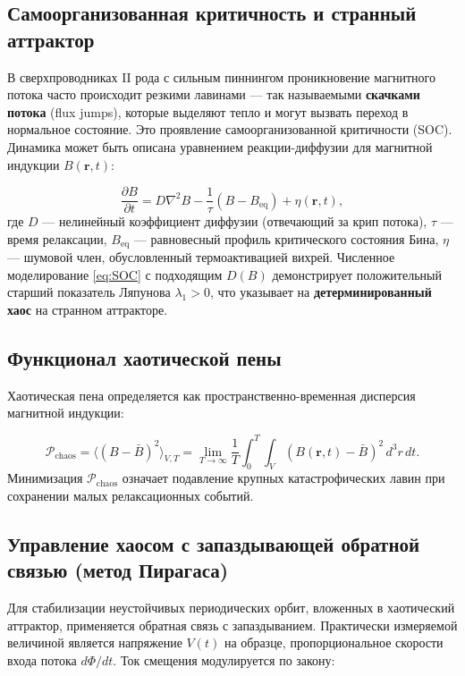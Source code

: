\documentclass[12pt,a4paper]{article}
\numberwithin{equation}{section}
\begin{document}
\subsection{Самоорганизованная критичность и странный аттрактор}

В сверхпроводниках II рода с сильным пиннингом проникновение магнитного потока часто происходит резкими лавинами — так называемыми \textbf{скачками потока} (flux jumps), которые выделяют тепло и могут вызвать переход в нормальное состояние. Это проявление самоорганизованной критичности (SOC). Динамика может быть описана уравнением реакции-диффузии для магнитной индукции $B(\mathbf{r}, t)$:

\begin{equation}
\frac{\partial B}{\partial t} = D \nabla^2 B - \frac{1}{\tau} (B - B_{\text{eq}}) + \eta(\mathbf{r}, t),
\label{eq:SOC}
\end{equation}
где $D$ — нелинейный коэффициент диффузии (отвечающий за крип потока), $\tau$ — время релаксации, $B_{\text{eq}}$ — равновесный профиль критического состояния Бина, $\eta$ — шумовой член, обусловленный термоактивацией вихрей. Численное моделирование \eqref{eq:SOC} с подходящим $D(B)$ демонстрирует положительный старший показатель Ляпунова $\lambda_1 > 0$, что указывает на \textbf{детерминированный хаос} на странном аттракторе.

\subsection{Функционал хаотической пены}

Хаотическая пена определяется как пространственно-временная дисперсия магнитной индукции:

\begin{equation}
\mathcal{P}_{\text{chaos}} = \langle (B - \bar{B})^2 \rangle_{V,T} = \lim_{T\to\infty} \frac{1}{T} \int_0^T \int_V (B(\mathbf{r},t) - \bar{B})^2 \, d^3 r \, dt.
\label{eq:Pchaos}
\end{equation}
Минимизация $\mathcal{P}_{\text{chaos}}$ означает подавление крупных катастрофических лавин при сохранении малых релаксационных событий.

\subsection{Управление хаосом с запаздывающей обратной связью (метод Пирагаса)}

Для стабилизации неустойчивых периодических орбит, вложенных в хаотический аттрактор, применяется обратная связь с запаздыванием. Практически измеряемой величиной является напряжение $V(t)$ на образце, пропорциональное скорости входа потока $d\Phi/dt$. Ток смещения модулируется по закону:
\end{document}
